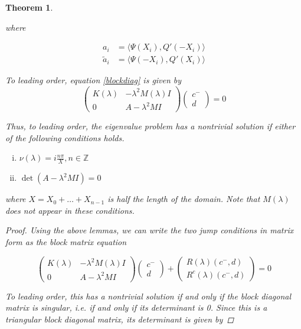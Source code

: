 \documentclass[12pt]{article}
\def\Z{{\mathbb Z}}
\newtheorem{theorem}{Theorem}
\begin{document}
\begin{theorem}
\begin{enumerate}
where

\begin{align*}
a_i &= \langle \Psi(X_i), Q'(-X_i) \rangle \\
\tilde{a}_i &= \langle \Psi(-X_i), Q'(X_i) \rangle
\end{align*}

\end{enumerate}

To leading order, equation \eqref{blockdiag} is given by
\begin{equation}
\begin{pmatrix}
K(\lambda) & -\lambda^2 M(\lambda) I  \\
0 & A - \lambda^2 MI 
\end{pmatrix}
\begin{pmatrix}c^- \\ d \end{pmatrix} = 0
\end{equation}

Thus, to leading order, the eigenvalue problem has a nontrivial solution if either of the following conditions holds.

\begin{enumerate}[(i)]
\item $\nu(\lambda) = i \frac{n \pi}{X}, n \in \Z$ 
\item $\det(A - \lambda^2 MI) = 0$
\end{enumerate}

where $X = X_0 + \dots + X_{n-1}$ is half the length of the domain. Note that $M(\lambda)$ does not appear in these conditions.\\

\begin{proof}

Using the above lemmas, we can write the two jump conditions in matrix form as the block matrix equation

\[
\begin{pmatrix}
K(\lambda) & -\lambda^2 M(\lambda) I \\
0 & A - \lambda^2 MI
\end{pmatrix}
\begin{pmatrix}c^- \\ d \end{pmatrix} +
\begin{pmatrix} R(\lambda)(c^-,d) \\ R^c( \lambda)(c^-,d) \end{pmatrix}  = 0
\]

To leading order, this has a nontrivial solution if and only if the block diagonal matrix is singular, i.e. if and only if its determinant is 0. Since this is a triangular block diagonal matrix, its determinant is given by 


\end{proof}
\end{theorem}
\end{document}
